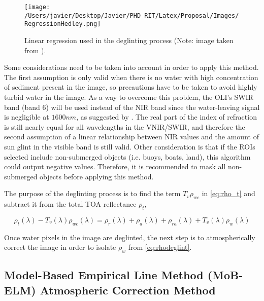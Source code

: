 \begin{figure}[!ht]
  \centering
  \texttt{[image: /Users/javier/Desktop/Javier/PHD\_RIT/Latex/Proposal/Images/RegressionHedley.png]}
  \caption{Linear regression used in the deglinting process (Note: image taken from \cite{Hedley:2005}). \label{fig:regressiohedley} } 
\end{figure}

Some considerations need to be taken into account in order to apply this method. The first assumption is only valid when there is no water with high concentration of sediment present in the image, so precautions have to be taken to avoid highly turbid water in the image. As a way to overcome this problem, the OLI's SWIR band (band 6) will be used instead of the NIR band since the water-leaving signal is negligible at $1600nm$, as suggested by \cite{GeraceThesis}. The real part of the index of refraction is still nearly equal for all wavelengths in the VNIR/SWIR, and therefore the second assumption of a linear relationship between NIR values and the amount of sun glint in the visible band is still valid. Other consideration is that if the ROIs selected include non-submerged objects (i.e. buoys, boats, land), this algorithm could output negative values. Therefore, it is recommended to mask all non-submerged objects before applying this method.


The purpose of the deglinting process is to find the term $T_v\rho_{wc}$ in \autoref{eq:rho_t} and subtract it from the total TOA reflectance $\rho_t$,

\begin{equation}\label{eq:rhodeglint}
  \rho_t(\lambda)-T_v(\lambda)\rho_{wc}(\lambda) = \rho_r(\lambda)+\rho_a(\lambda)+\rho_{ra}(\lambda)+T_v(\lambda)\rho_{w}(\lambda)
\end{equation}

Once water pixels in the image are deglinted, the next step is to atmospherically correct the image in order to isolate $\rho_w$ from \autoref{eq:rhodeglint}.



\subsection{Model-Based Empirical Line Method (MoB-ELM) Atmospheric Correction Method}

